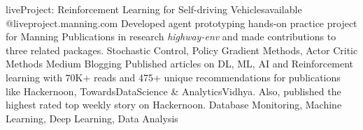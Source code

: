 
\begin{projects}
    \project
	{liveProject: Reinforcement Learning for Self-driving Vehicles}{available @liveproject.manning.com}
	{}
	{Developed agent prototyping hands-on practice project for Manning Publications in research \textit{highway-env} and made contributions to three related packages.}
	{Stochastic Control, Policy Gradient Methods, Actor Critic Methods}
	\project
	{Medium Blogging}{}
	{
	}
	{Published articles on DL, ML, AI and Reinforcement learning with 70K+ reads and 475+ unique recommendations for publications like Hackernoon, TowardsDataScience \& AnalyticsVidhya. Also, published the highest rated top weekly story on Hackernoon.}
	{Database Monitoring, Machine Learning, Deep Learning, Data Analysis}
	

    
\end{projects}